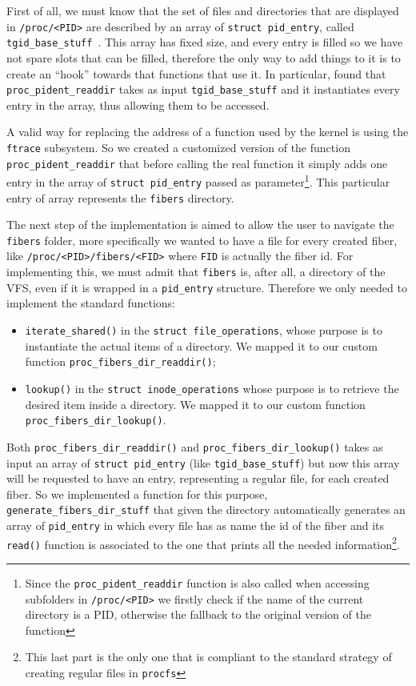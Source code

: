 \documentclass[a4paper,10pt]{article}
\begin{document}
First of all, we must know that the set of files and directories that are displayed in \lstinline{/proc/<PID>} are described by an array of \lstinline{struct pid_entry}, called \lstinline{tgid_base_stuff}~\cite{kern_tgid_base_stuff}. This array has fixed size, and every entry is filled so we have not spare slots that can be filled, therefore the only way to add things to it is to create an ``hook'' towards that functions that use it. In particular, found that \lstinline{proc_pident_readdir} takes as input \lstinline{tgid_base_stuff} and it instantiates every entry in the array, thus allowing them to be accessed. 

A valid way for replacing the address of a function used by the kernel is using the \lstinline{ftrace} subsystem. So we created a customized version of the function \lstinline{proc_pident_readdir} that before calling the real function it simply adds one entry in the array of \lstinline{struct pid_entry} passed as parameter\footnote{Since the \lstinline{proc_pident_readdir} function is also called when accessing subfolders in \lstinline{/proc/<PID>} we firstly check if the name of the current directory is a PID, otherwise the fallback to the original version of the function}. This particular entry of array represents the \texttt{fibers} directory.

The next step of the implementation is aimed to allow the user to navigate the \texttt{fibers} folder, more specifically we wanted to have a file for every created fiber, like \lstinline{/proc/<PID>/fibers/<FID>} where \texttt{FID} is actually the fiber id. For implementing this, we must admit that \texttt{fibers} is, after all, a directory of the VFS, even if it is wrapped in a \lstinline{pid_entry} structure. Therefore we only needed to implement the standard functions: 
\begin{itemize}
  \item \lstinline{iterate_shared()} in the \lstinline{struct file_operations}, whose purpose is to instantiate the actual items of a directory. We mapped it to our custom function \lstinline{proc_fibers_dir_readdir()};
  \item \lstinline{lookup()} in the \lstinline{struct inode_operations} whose purpose is to retrieve the desired item inside a directory. We mapped it to our custom function \lstinline{proc_fibers_dir_lookup()}.
\end{itemize}
Both \lstinline{proc_fibers_dir_readdir()} and \lstinline{proc_fibers_dir_lookup()} takes as input an array of \lstinline{struct pid_entry} (like \lstinline{tgid_base_stuff}) but now this array will be requested to have an entry, representing a regular file, for each created fiber. So we implemented a function for this purpose, \lstinline{generate_fibers_dir_stuff} that given the directory automatically generates an array of \lstinline{pid_entry} in which every file has as name the id of the fiber and its \lstinline{read()} function is associated to the one that prints all the needed information\footnote{This last part is the only one that is compliant to the standard strategy of creating regular files in \texttt{procfs}}.
\end{document}
